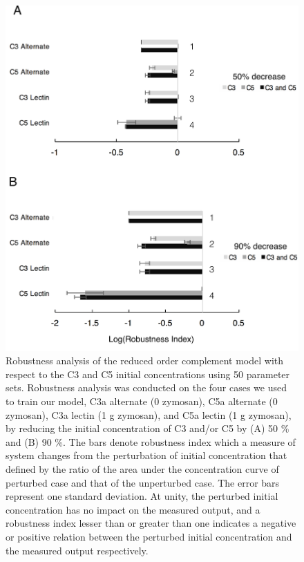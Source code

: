 \documentclass[12pt]{article}
\begin{document}
\begin{figure}[h]
\centering
\includegraphics[width=1.0\textwidth]{./figs/Figure5_RobustnessAnalysis_v2.pdf}
\caption{Robustness analysis of the reduced order complement model with respect to the C3 and C5 initial concentrations using 50 parameter sets.  Robustness analysis was conducted on the four cases we used to train our model, C3a alternate (0 zymosan), C5a alternate (0 zymosan),  C3a lectin (1 g zymosan), and C5a lectin (1 g zymosan), by reducing the initial concentration of C3 and/or C5 by (A) 50 \% and (B) 90 \%. The bars denote robustness index which a measure of system changes from the perturbation of initial concentration that defined by the ratio of the area under the concentration curve of perturbed case and that of the unperturbed case. The error bars represent one standard deviation. At unity, the perturbed initial concentration has no impact on the measured output, and a robustness index lesser than or greater than one indicates a negative or positive relation between the perturbed initial concentration and the measured output respectively.}\label{fig-robustness-analysis}
\end{figure}
\end{document}
